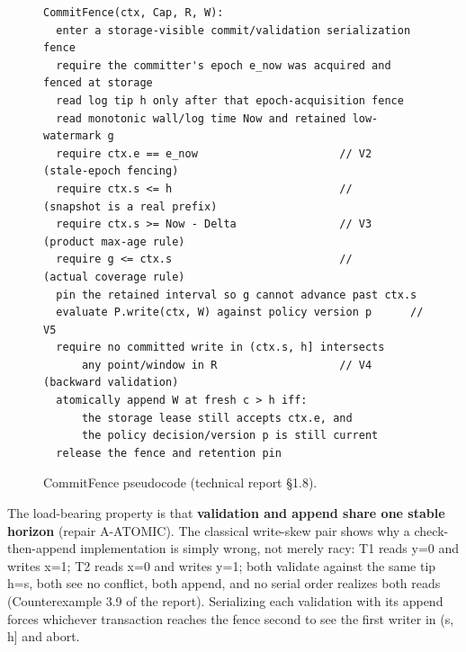 \documentclass[
  11pt,
]{article}
\begin{document}
\begin{figure}[t]
\begin{verbatim}
CommitFence(ctx, Cap, R, W):
  enter a storage-visible commit/validation serialization fence
  require the committer's epoch e_now was acquired and fenced at storage
  read log tip h only after that epoch-acquisition fence
  read monotonic wall/log time Now and retained low-watermark g
  require ctx.e == e_now                      // V2  (stale-epoch fencing)
  require ctx.s <= h                          //     (snapshot is a real prefix)
  require ctx.s >= Now - Delta                // V3  (product max-age rule)
  require g <= ctx.s                          //     (actual coverage rule)
  pin the retained interval so g cannot advance past ctx.s
  evaluate P.write(ctx, W) against policy version p      // V5
  require no committed write in (ctx.s, h] intersects
      any point/window in R                   // V4  (backward validation)
  atomically append W at fresh c > h iff:
      the storage lease still accepts ctx.e, and
      the policy decision/version p is still current
  release the fence and retention pin
\end{verbatim}
\caption{CommitFence pseudocode (technical report \S1.8).}
\label{fig:fence}
\end{figure}

The load-bearing property is that \textbf{validation and append share one stable horizon} (repair A-ATOMIC). The classical write-skew pair shows why a check-then-append implementation is simply wrong, not merely racy: T1 reads y=0 and writes x=1; T2 reads x=0 and writes y=1; both validate against the same tip h=s, both see no conflict, both append, and no serial order realizes both reads (Counterexample 3.9 of the report). Serializing each validation with its append forces whichever transaction reaches the fence second to see the first writer in (s, h{]} and abort.
\end{document}
